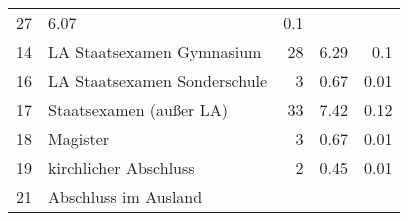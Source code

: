 \begin{longtable}{lXrrr}
       \num{27} &
       \num[round-mode=places,round-precision=2]{6.07} &
         \num[round-mode=places,round-precision=2]{0.1} \\

     14 &
     \multicolumn{1}{X}{ LA Staatsexamen Gymnasium   } &


       \num{28} &
       \num[round-mode=places,round-precision=2]{6.29} &
         \num[round-mode=places,round-precision=2]{0.1} \\

     16 &
     \multicolumn{1}{X}{ LA Staatsexamen Sonderschule   } &


       \num{3} &
       \num[round-mode=places,round-precision=2]{0.67} &
         \num[round-mode=places,round-precision=2]{0.01} \\

     17 &
     \multicolumn{1}{X}{ Staatsexamen (außer LA)   } &


       \num{33} &
       \num[round-mode=places,round-precision=2]{7.42} &
         \num[round-mode=places,round-precision=2]{0.12} \\

     18 &
     \multicolumn{1}{X}{ Magister   } &


       \num{3} &
       \num[round-mode=places,round-precision=2]{0.67} &
         \num[round-mode=places,round-precision=2]{0.01} \\

     19 &
     \multicolumn{1}{X}{ kirchlicher Abschluss   } &


       \num{2} &
       \num[round-mode=places,round-precision=2]{0.45} &
         \num[round-mode=places,round-precision=2]{0.01} \\

     21 &
     \multicolumn{1}{X}{ Abschluss im Ausland   } &



\end{longtable}
